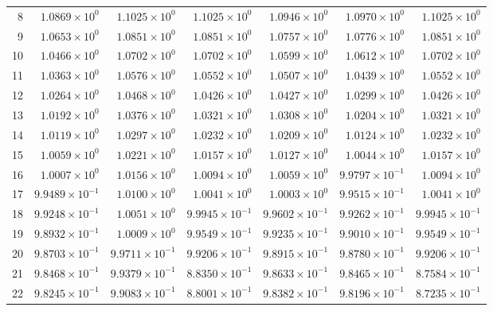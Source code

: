 \begin{table}[H]
\begin{tabular}{@{}rrrrrrr@{}}
8 & $1.0869\times10^{0}$ & $1.1025\times10^{0}$ & $1.1025\times10^{0}$ & $1.0946\times10^{0}$ & $1.0970\times10^{0}$ & $1.1025\times10^{0}$\\
9 & $1.0653\times10^{0}$ & $1.0851\times10^{0}$ & $1.0851\times10^{0}$ & $1.0757\times10^{0}$ & $1.0776\times10^{0}$ & $1.0851\times10^{0}$\\
10 & $1.0466\times10^{0}$ & $1.0702\times10^{0}$ & $1.0702\times10^{0}$ & $1.0599\times10^{0}$ & $1.0612\times10^{0}$ & $1.0702\times10^{0}$\\
11 & $1.0363\times10^{0}$ & $1.0576\times10^{0}$ & $1.0552\times10^{0}$ & $1.0507\times10^{0}$ & $1.0439\times10^{0}$ & $1.0552\times10^{0}$\\
12 & $1.0264\times10^{0}$ & $1.0468\times10^{0}$ & $1.0426\times10^{0}$ & $1.0427\times10^{0}$ & $1.0299\times10^{0}$ & $1.0426\times10^{0}$\\
13 & $1.0192\times10^{0}$ & $1.0376\times10^{0}$ & $1.0321\times10^{0}$ & $1.0308\times10^{0}$ & $1.0204\times10^{0}$ & $1.0321\times10^{0}$\\
14 & $1.0119\times10^{0}$ & $1.0297\times10^{0}$ & $1.0232\times10^{0}$ & $1.0209\times10^{0}$ & $1.0124\times10^{0}$ & $1.0232\times10^{0}$\\
15 & $1.0059\times10^{0}$ & $1.0221\times10^{0}$ & $1.0157\times10^{0}$ & $1.0127\times10^{0}$ & $1.0044\times10^{0}$ & $1.0157\times10^{0}$\\
16 & $1.0007\times10^{0}$ & $1.0156\times10^{0}$ & $1.0094\times10^{0}$ & $1.0059\times10^{0}$ & $9.9797\times10^{-1}$ & $1.0094\times10^{0}$\\
17 & $9.9489\times10^{-1}$ & $1.0100\times10^{0}$ & $1.0041\times10^{0}$ & $1.0003\times10^{0}$ & $9.9515\times10^{-1}$ & $1.0041\times10^{0}$\\
18 & $9.9248\times10^{-1}$ & $1.0051\times10^{0}$ & $9.9945\times10^{-1}$ & $9.9602\times10^{-1}$ & $9.9262\times10^{-1}$ & $9.9945\times10^{-1}$\\
19 & $9.8932\times10^{-1}$ & $1.0009\times10^{0}$ & $9.9549\times10^{-1}$ & $9.9235\times10^{-1}$ & $9.9010\times10^{-1}$ & $9.9549\times10^{-1}$\\
20 & $9.8703\times10^{-1}$ & $9.9711\times10^{-1}$ & $9.9206\times10^{-1}$ & $9.8915\times10^{-1}$ & $9.8780\times10^{-1}$ & $9.9206\times10^{-1}$\\
21 & $9.8468\times10^{-1}$ & $9.9379\times10^{-1}$ & $8.8350\times10^{-1}$ & $9.8633\times10^{-1}$ & $9.8465\times10^{-1}$ & $8.7584\times10^{-1}$\\
22 & $9.8245\times10^{-1}$ & $9.9083\times10^{-1}$ & $8.8001\times10^{-1}$ & $9.8382\times10^{-1}$ & $9.8196\times10^{-1}$ & $8.7235\times10^{-1}$\\

\end{tabular}
\end{table}
